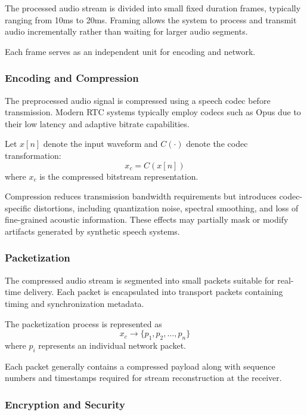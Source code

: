 The processed audio stream is divided into small fixed duration frames, typically ranging from 10ms to 20ms. Framing allows the system to process and transmit audio incrementally rather than waiting for larger audio segments. 

Each frame serves as an independent unit for encoding and network.

\subsubsection{Encoding and Compression}

The preprocessed audio signal is compressed using a speech codec before transmission. Modern RTC systems typically employ codecs such as Opus due to their low latency and adaptive bitrate capabilities. 

Let $x[n]$ denote the input waveform and $C(\cdot)$ denote the codec transformation:
\begin{equation}
x_c = C(x[n])
\label{eq:codec_transform}
\end{equation}
where $x_c$ is the compressed bitstream representation.

Compression reduces transmission bandwidth requirements but introduces codec-specific distortions, including quantization noise, spectral smoothing, and loss of fine-grained acoustic information. These effects may partially mask or modify artifacts generated by synthetic speech systems.

\subsubsection{Packetization}

The compressed audio stream is segmented into small packets suitable for real-time delivery. Each packet is encapsulated into transport packets containing timing and synchronization metadata.

The packetization process is represented as
\begin{equation}
x_c \rightarrow \{p_1, p_2, \ldots, p_n\}
\label{eq:packetization}
\end{equation}
where $p_i$ represents an individual network packet.

Each packet generally contains a compressed payload along with sequence numbers and timestamps required for stream reconstruction at the receiver.

\subsubsection{Encryption and Security}


